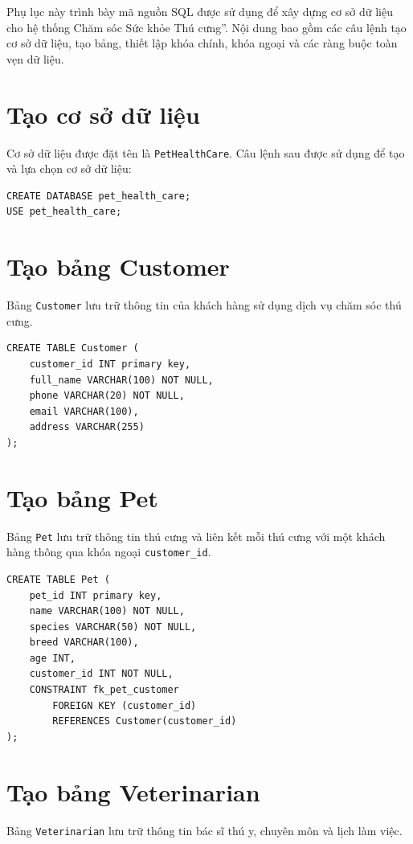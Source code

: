 Phụ lục này trình bày mã nguồn SQL được sử dụng để xây dựng cơ sở dữ liệu cho hệ thống Chăm sóc Sức khỏe Thú cưng''. Nội dung bao gồm các câu lệnh tạo cơ sở dữ liệu, tạo bảng, thiết lập khóa chính, khóa ngoại và các ràng buộc toàn vẹn dữ liệu.

\section{Tạo cơ sở dữ liệu}
Cơ sở dữ liệu được đặt tên là \texttt{PetHealthCare}. Câu lệnh sau được sử dụng để tạo và lựa chọn cơ sở dữ liệu:

\begin{verbatim}
CREATE DATABASE pet_health_care;
USE pet_health_care;
\end{verbatim}

\section{Tạo bảng Customer}
Bảng \texttt{Customer} lưu trữ thông tin của khách hàng sử dụng dịch vụ chăm sóc thú cưng.

\begin{verbatim}
CREATE TABLE Customer (
    customer_id INT primary key,
    full_name VARCHAR(100) NOT NULL,
    phone VARCHAR(20) NOT NULL,
    email VARCHAR(100),
    address VARCHAR(255)
);
\end{verbatim}

\section{Tạo bảng Pet}
Bảng \texttt{Pet} lưu trữ thông tin thú cưng và liên kết mỗi thú cưng với một khách hàng thông qua khóa ngoại \texttt{customer\_id}.

\begin{verbatim}
CREATE TABLE Pet (
    pet_id INT primary key,
    name VARCHAR(100) NOT NULL,
    species VARCHAR(50) NOT NULL,
    breed VARCHAR(100),
    age INT,
    customer_id INT NOT NULL,
    CONSTRAINT fk_pet_customer
        FOREIGN KEY (customer_id)
        REFERENCES Customer(customer_id)
);
\end{verbatim}

\section{Tạo bảng Veterinarian}
Bảng \texttt{Veterinarian} lưu trữ thông tin bác sĩ thú y, chuyên môn và lịch làm việc.

